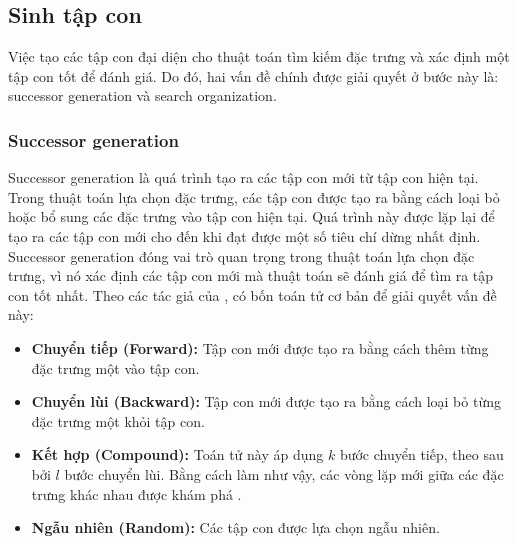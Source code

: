 \subsection{Sinh tập con}
Việc tạo các tập con đại diện cho thuật toán tìm kiếm đặc trưng và xác định một tập con tốt để đánh giá. Do đó, hai vấn đề chính được giải quyết ở bước này là: successor generation và search organization.

\subsubsection{Successor generation}
Successor generation là quá trình tạo ra các tập con mới từ tập con hiện tại. Trong thuật toán lựa chọn đặc trưng, các tập con được tạo ra bằng cách loại bỏ hoặc bổ sung các đặc trưng vào tập con hiện tại. Quá trình này được lặp lại để tạo ra các tập con mới cho đến khi đạt được một số tiêu chí dừng nhất định. Successor generation đóng vai trò quan trọng trong thuật toán lựa chọn đặc trưng, vì nó xác định các tập con mới mà thuật toán sẽ đánh giá để tìm ra tập con tốt nhất.
Theo các tác giả của \cite{liu2005toward}, có bốn toán tử cơ bản để giải quyết vấn đề này:
\begin{itemize}
	\item \textbf{Chuyển tiếp (Forward):} Tập con mới được tạo ra bằng cách thêm từng đặc trưng một vào tập con.
	\item \textbf{Chuyển lùi (Backward):} Tập con mới được tạo ra bằng cách loại bỏ từng đặc trưng một khỏi tập con.
	\item \textbf{Kết hợp (Compound):} Toán tử này áp dụng $k$ bước chuyển tiếp, theo sau bởi $l$ bước chuyển lùi. Bằng cách làm như vậy, các vòng lặp mới giữa các đặc trưng khác nhau được khám phá \cite{kumar2014feature}.
	\item \textbf{Ngẫu nhiên (Random):} Các tập con được lựa chọn ngẫu nhiên.
\end{itemize}

